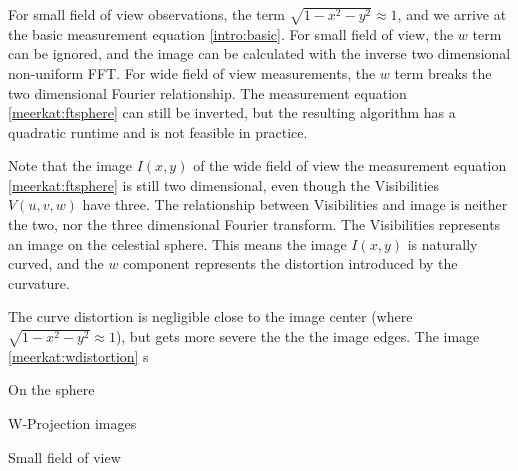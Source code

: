 For small field of view observations, the term $\sqrt{1 - x^2 - y ^2} \approx 1$, and we arrive at the basic measurement equation \eqref{intro:basic}. For small field of view, the $w$ term can be ignored, and the image can be calculated with the inverse two dimensional non-uniform FFT. For wide field of view measurements, the $w$ term breaks the two dimensional Fourier relationship. The measurement equation \eqref{meerkat:ftsphere} can still be inverted, but the resulting algorithm has a quadratic runtime and is not feasible in practice.

Note that the image $I(x,y)$ of the wide field of view the measurement equation \eqref{meerkat:ftsphere} is still two dimensional, even though the Visibilities $V(u, v, w)$ have three. The relationship between Visibilities and image is neither the two, nor the three dimensional Fourier transform. The Visibilities represents an image on the celestial sphere. This means the image $I(x,y)$ is naturally curved, and the $w$ component represents the distortion introduced by the curvature.

The curve distortion is negligible close to the image center (where $\sqrt{1 - x^2 - y ^2} \approx 1$), but gets more severe the the the image edges. The image \ref{meerkat:wdistortion} s

On the sphere

W-Projection images 

Small field of view





